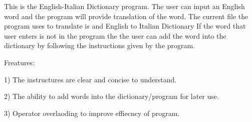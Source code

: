 This is the English-\/\+Italian Dictionary program. The user can input an English word and the program will provide translation of the word. The current file the program uses to translate is and English to Italian Dictionary If the word that user enters is not in the program the the user can add the word into the dictionary by following the instructions given by the program.

Freatures\+:

1) The instructures are clear and concise to understand.

2) The ability to add words into the dictionary/program for later use.

3) Operator overlaoding to improve effiecncy of program. 